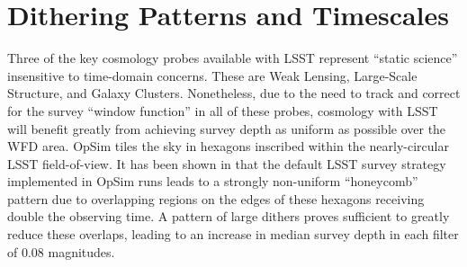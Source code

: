 %
%
%
%
%
%
%
\clearpage
\section{Dithering Patterns and Timescales}
\def\secname{dithering}\label{sec:\secname}




Three of the key cosmology probes available with LSST represent ``static science'' insensitive to time-domain concerns.  These are Weak Lensing, Large-Scale Structure, and Galaxy Clusters.  Nonetheless, due to the need to track and correct for the survey ``window function'' in all of these probes, cosmology with LSST will benefit greatly from achieving survey depth as uniform as possible over the WFD area.  OpSim tiles the sky in hexagons inscribed within the nearly-circular LSST field-of-view.  It has been shown in \citet{CarrollEtal2014} that the default LSST survey strategy implemented in OpSim runs leads to a strongly non-uniform ``honeycomb'' pattern due to overlapping regions on the edges of these hexagons receiving double the observing time.  A pattern of large dithers proves sufficient to greatly reduce these overlaps, leading to an increase in median survey depth in each filter of 0.08 magnitudes.  

